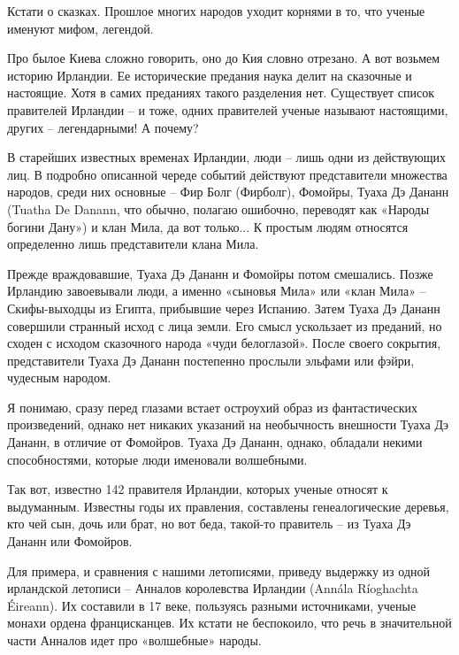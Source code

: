 Кстати о сказках. Прошлое многих народов уходит корнями в то, что ученые именуют мифом, легендой.

Про былое Киева сложно говорить, оно до Кия словно отрезано. А вот возьмем историю Ирландии. Ее исторические предания наука делит на сказочные и настоящие. Хотя в самих преданиях такого разделения нет. Существует список правителей Ирландии – и тоже, одних правителей ученые называют настоящими, других – легендарными! А почему?

В старейших известных временах Ирландии, люди – лишь одни из действующих лиц. В подробно описанной череде событий действуют представители множества народов, среди них основные – Фир Болг (Фирболг), Фомойры, Туаха Дэ Дананн (Tuatha De Danann, что обычно, полагаю ошибочно, переводят как «Народы богини Дану») и клан Мила, да вот только... К простым людям относятся определенно лишь представители клана Мила.

Прежде враждовавшие, Туаха Дэ Дананн и Фомойры потом смешались. Позже Ирландию завоевывали люди, а именно «сыновья Мила» или «клан Мила» – Скифы-выходцы из Египта, прибывшие через Испанию. Затем Туаха Дэ Дананн совершили странный исход с лица земли. Его смысл ускользает из преданий, но сходен с исходом сказочного народа «чуди белоглазой». После своего сокрытия, представители Туаха Дэ Дананн постепенно прослыли эльфами или фэйри, чудесным народом.


Я понимаю, сразу перед глазами встает остроухий образ из фантастических произведений, однако нет никаких указаний на необычность внешности Туаха Дэ Дананн, в отличие от Фомойров. Туаха Дэ Дананн, однако, обладали некими способностями, которые люди именовали волшебными.

Так вот, известно 142 правителя Ирландии, которых ученые относят к выдуманным. Известны годы их правления, составлены генеалогические деревья, кто чей сын, дочь или брат, но вот беда, такой-то правитель – из Туаха Дэ Дананн или Фомойров.

Для примера, и сравнения с нашими летописями, приведу выдержку из одной ирландской летописи – Анналов королевства Ирландии (Annála Ríoghachta Éireann). Их составили в 17 веке, пользуясь разными источниками, ученые монахи ордена францисканцев. Их кстати не беспокоило, что речь в значительной части Анналов идет про «волшебные» народы.

